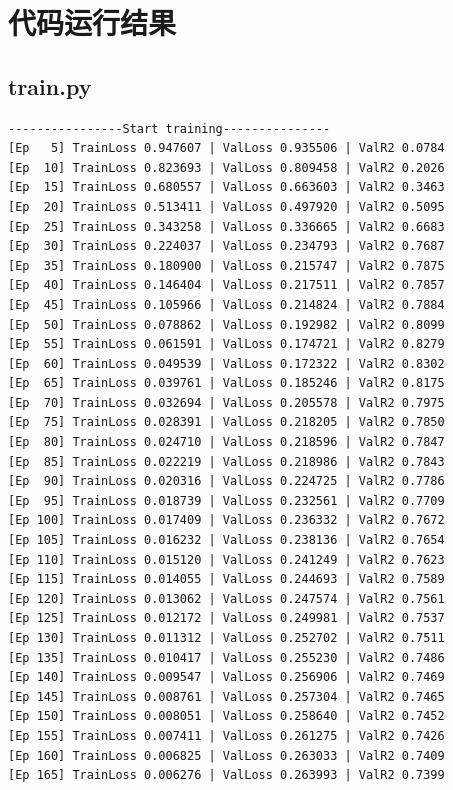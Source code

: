 \documentclass[a4paper, 12pt]{article}
\begin{document}
	




	
	\section{代码运行结果}
\subsection{train.py}	
\begin{lstlisting}
----------------Start training---------------
[Ep   5] TrainLoss 0.947607 | ValLoss 0.935506 | ValR2 0.0784
[Ep  10] TrainLoss 0.823693 | ValLoss 0.809458 | ValR2 0.2026
[Ep  15] TrainLoss 0.680557 | ValLoss 0.663603 | ValR2 0.3463
[Ep  20] TrainLoss 0.513411 | ValLoss 0.497920 | ValR2 0.5095
[Ep  25] TrainLoss 0.343258 | ValLoss 0.336665 | ValR2 0.6683
[Ep  30] TrainLoss 0.224037 | ValLoss 0.234793 | ValR2 0.7687
[Ep  35] TrainLoss 0.180900 | ValLoss 0.215747 | ValR2 0.7875
[Ep  40] TrainLoss 0.146404 | ValLoss 0.217511 | ValR2 0.7857
[Ep  45] TrainLoss 0.105966 | ValLoss 0.214824 | ValR2 0.7884
[Ep  50] TrainLoss 0.078862 | ValLoss 0.192982 | ValR2 0.8099
[Ep  55] TrainLoss 0.061591 | ValLoss 0.174721 | ValR2 0.8279
[Ep  60] TrainLoss 0.049539 | ValLoss 0.172322 | ValR2 0.8302
[Ep  65] TrainLoss 0.039761 | ValLoss 0.185246 | ValR2 0.8175
[Ep  70] TrainLoss 0.032694 | ValLoss 0.205578 | ValR2 0.7975
[Ep  75] TrainLoss 0.028391 | ValLoss 0.218205 | ValR2 0.7850
[Ep  80] TrainLoss 0.024710 | ValLoss 0.218596 | ValR2 0.7847
[Ep  85] TrainLoss 0.022219 | ValLoss 0.218986 | ValR2 0.7843
[Ep  90] TrainLoss 0.020316 | ValLoss 0.224725 | ValR2 0.7786
[Ep  95] TrainLoss 0.018739 | ValLoss 0.232561 | ValR2 0.7709
[Ep 100] TrainLoss 0.017409 | ValLoss 0.236332 | ValR2 0.7672
[Ep 105] TrainLoss 0.016232 | ValLoss 0.238136 | ValR2 0.7654
[Ep 110] TrainLoss 0.015120 | ValLoss 0.241249 | ValR2 0.7623
[Ep 115] TrainLoss 0.014055 | ValLoss 0.244693 | ValR2 0.7589
[Ep 120] TrainLoss 0.013062 | ValLoss 0.247574 | ValR2 0.7561
[Ep 125] TrainLoss 0.012172 | ValLoss 0.249981 | ValR2 0.7537
[Ep 130] TrainLoss 0.011312 | ValLoss 0.252702 | ValR2 0.7511
[Ep 135] TrainLoss 0.010417 | ValLoss 0.255230 | ValR2 0.7486
[Ep 140] TrainLoss 0.009547 | ValLoss 0.256906 | ValR2 0.7469
[Ep 145] TrainLoss 0.008761 | ValLoss 0.257304 | ValR2 0.7465
[Ep 150] TrainLoss 0.008051 | ValLoss 0.258640 | ValR2 0.7452
[Ep 155] TrainLoss 0.007411 | ValLoss 0.261275 | ValR2 0.7426
[Ep 160] TrainLoss 0.006825 | ValLoss 0.263033 | ValR2 0.7409
[Ep 165] TrainLoss 0.006276 | ValLoss 0.263993 | ValR2 0.7399

\end{lstlisting}
\end{document}
